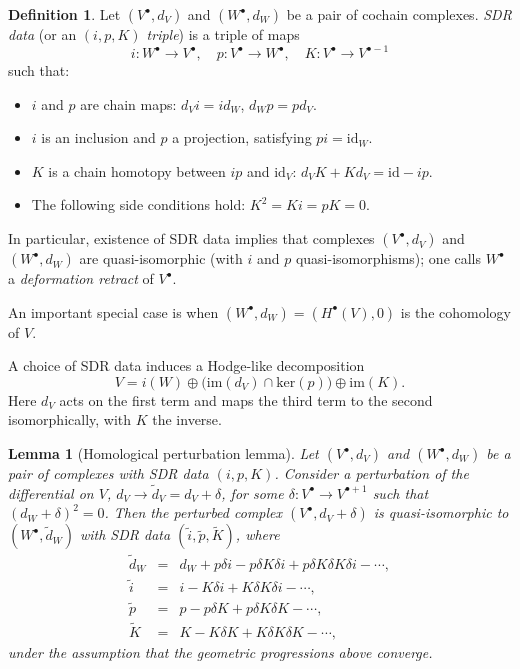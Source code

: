 \documentclass[11pt,a4paper]{amsart}
\theoremstyle{plain} %
\newtheorem{lem}[thm]{Lemma}
\theoremstyle{definition}
\newtheorem{defn}[thm]{Definition}
\theoremstyle{remark}
\newcommand{\mr}{\mathrm}
\newcommand{\bt}{\bullet}
\newcommand{\ra}{\rightarrow}
\newcommand{\til}{\widetilde}
\begin{document}
\begin{defn}
Let $(V^\bt,d_V)$ and $(W^\bt,d_W)$ be a pair of cochain complexes. \emph{SDR data} (or an \emph{$(i,p,K)$ triple}) is a triple of maps 
\begin{equation}
    i\colon W^\bt \ra V^\bt,\quad p\colon V^\bt\ra W^\bt,\quad K\colon V^\bt\ra V^{\bt-1}
\end{equation}
such that:
\begin{itemize}
    \item $i$ and $p$ are chain maps: $d_V i=i d_W$, $d_W p=p d_V$.
    \item $i$ is an inclusion and $p$ a projection, satisfying $pi=\mr{id}_W$.
    \item $K$ is a chain homotopy between $ip$ and $\mr{id}_V$: $d_V K+K d_V=\mr{id}-ip$.
    \item The following side conditions hold: $K^2=Ki=pK=0$.
\end{itemize}
\end{defn}
In particular, existence of SDR data implies that complexes $(V^\bt,d_V)$ and $(W^\bt,d_W)$ are quasi-isomorphic (with $i$ and $p$ quasi-isomorphisms); one calls $W^\bt$ a \emph{deformation retract} of $V^\bt$. 

An important special case is when $(W^\bt,d_W)=(H^\bt(V),0)$ is the cohomology of $V$. 

A choice of SDR data induces a Hodge-like decomposition
\begin{equation}\label{App A Hodge decomp}
    V=i(W)\oplus \Big(\mr{im}(d_V)\cap \mr{ker}(p)\Big) \oplus \mr{im}(K).
\end{equation}
Here $d_V$ acts on the first term and maps the third term to the second isomorphically, with $K$ the inverse.

\begin{lem}[Homological perturbation lemma]\label{lem: HPL}
Let $(V^\bt,d_V)$ and $(W^\bt,d_W)$ be a pair of complexes with SDR data $(i,p,K)$.
Consider a perturbation of the differential on $V$, $d_V \ra \til{d}_V=d_V+\delta$, for some $\delta\colon V^\bt\ra V^{\bt+1}$ such that $(d_W+\delta)^2=0$. Then the perturbed complex $(V^\bt,d_V+\delta)$ is quasi-isomorphic to $(W^\bt,\til{d}_W %
)$ with SDR data
$(\til{i},\til{p},\til{K})$, where
\begin{eqnarray}
    \til{d}_W&=& d_W+p\delta i-p\delta K \delta i + p\delta K\delta K \delta i-\cdots,\\
    \til{i}&=& i-K\delta i+K\delta K\delta i-\cdots, \\
    \til{p}&=& p-p\delta K + p\delta K\delta K - \cdots, \\
    \til{K}&=& K-K\delta K+K\delta K\delta K-\cdots,
\end{eqnarray}
under the assumption that the geometric progressions above converge.
\end{lem}
\end{document}

